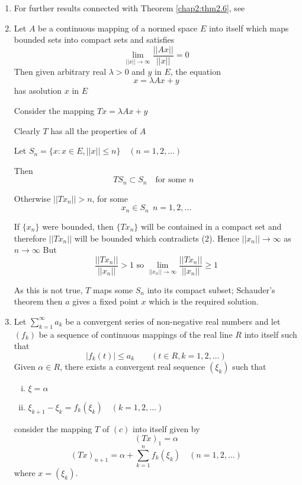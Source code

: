 \begin{enumerate}[(1)]
\item For further results connected with Theorem \ref{chap2:thm2.6},
  see \cite{key19} 

\item Let $A$ be a continuous mapping of a normed space $E$ into
  itself which maps bounded sets into compact sets and satisfies 
  $$
  \lim_{|| x || \to \infty} \frac{|| Ax ||}{|| x ||} = 0
  $$
  Then given arbitrary real $\lambda > 0$ and $y$ in $E$, the equation
  $$
  x = \lambda Ax + y
  $$
  has a\pageoriginale solution $x$ in $E$
  
  Consider the mapping $Tx = \lambda Ax + y$
  
  Clearly $T$ has all the properties of $A$
  
  Let $S_n = \{x : x \in E, || x || \le n \} \quad (n = 1, 2, \ldots)$ 

Then
\begin{equation*}
T S_n \subset S_n\text{~~ for some $n$ }\tag{1}\label{eq1}
\end{equation*}

Otherwise $||Tx_n|| > n$, for some 
\begin{equation*}
x_n \in S_n ~~ n = 1,2, \ldots\tag{2}\label{eq2}
\end{equation*}

 If $\{x_n\}$ were bounded, then $\{Tx_n\}$ will be contained in a
 compact set and therefore $||T x_n ||$ will be bounded which
 contradicts (2). Hence $|| x_n || \to \infty$ as $n \to \infty$ But  
 $$
 \frac{|| Tx_n ||}{|| x_n ||} > 1 \text { so } \lim\limits_{|| x_n ||
   \to \infty} \frac{|| Tx_n ||}{|| x _n ||} \ge  1 
 $$
 
 As this is not true, $T$ maps some $S_n$ into its compact subset;
 Schau\-der's theorem then $a$ gives a fixed point $x$ which is the
 required solution. 

 \item Let $\sum\limits^{\infty}_{k = 1} a_k$ be a convergent series
   of non-negative real numbers and let $(f_k)$ be a sequence of
   continuous mappings of the real line $R$ into itself such that 
   $$
   |f_k (t) | \le a_k \qquad (t \in R, k = 1,2, \ldots)
   $$
   Given $\alpha \in R$, there exists a convergent real sequence
   $(\xi_k)$ such that 
   \begin{enumerate}[(i)]
   \item $\xi = \alpha$
   \item $\xi_{k + 1} - \xi_k = f_k (\xi_k) \quad (k = 1,2, \ldots)$
   \end{enumerate} 
   consider the mapping $T$ of $(c)$ into itself given by
   $$
   (Tx)_1 = \alpha
   $$
   $$
   (Tx)_{n + 1} = \alpha + \sum^{n}_{k = 1} f_k (\xi_k) \quad (n = 1,2, \ldots)
   $$\pageoriginale
   where $x = (\xi_k)$.


\end{enumerate}

